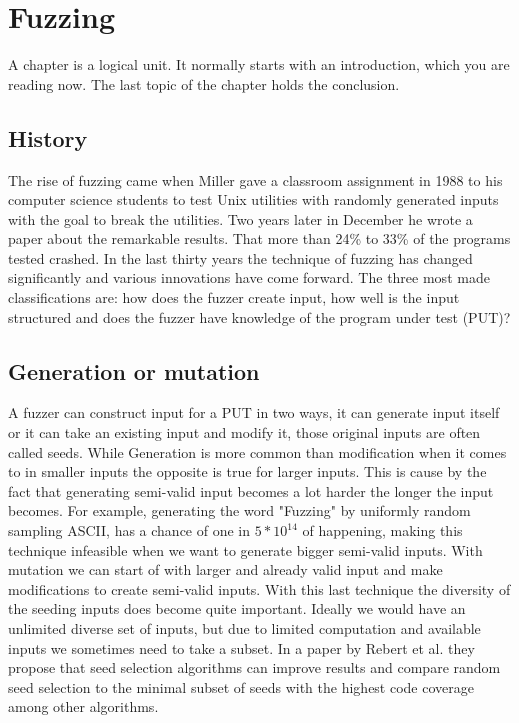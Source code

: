 \chapter{Fuzzing}
\label{cha:2:fuzzing}
A chapter is a logical unit. It normally starts with an introduction, which
you are reading now. The last topic of the chapter holds the conclusion.

%


\section{History} 
The rise of fuzzing came when Miller gave a classroom assignment\cite{21FuzzingAssignment} in 1988 to his computer science students to test Unix utilities with randomly generated inputs with the goal to break the utilities. Two years later in December he wrote a paper\cite{4originalFuzzingUnixUtils} about the remarkable results. That more than 24\% to 33\% of the programs tested crashed.
In the last thirty years the technique of fuzzing has changed significantly and various innovations have come forward. The three\cite{12Fuzzingasurvey}\cite{13manes2019survey} most made classifications are: how does the fuzzer create input, how well is the input structured and does the fuzzer have knowledge of the program under test (PUT)?

\section{Generation or mutation}
A fuzzer can construct input for a PUT in two ways, it can generate input itself or it can take an existing input and modify it, those original inputs are often called seeds. While Generation is more common than modification when it comes to in smaller inputs the opposite is true for larger inputs. This is cause by the fact that generating semi-valid input becomes a lot harder the longer the input becomes. For example, generating the word "Fuzzing" by uniformly random sampling ASCII, has a chance of one in $5*10^{14}$ of happening, making this technique infeasible when we want to generate bigger semi-valid inputs. With mutation we can start of with larger and already valid input and make modifications to create semi-valid inputs. With this last technique the diversity of the seeding inputs does become quite important. Ideally we would have an unlimited diverse set of inputs, but due to limited computation and available inputs we sometimes need to take a subset. In a paper by Rebert et al. \cite{14rebert2014seedselecting} they propose that seed selection algorithms can improve results and compare random seed selection to the minimal subset of seeds with the highest code coverage among other algorithms. 

